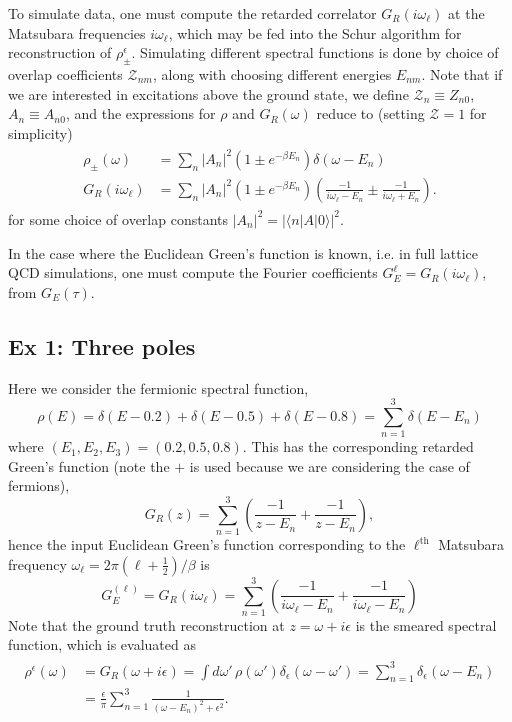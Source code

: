 To simulate data, one must compute the retarded correlator $G_R(i\omega_\ell)$ at the Matsubara frequencies $i\omega_\ell$, which may be fed into the Schur algorithm for reconstruction of $\rho_\pm^\epsilon$. Simulating different spectral functions is done by choice of overlap coefficients $\mathcal Z_{nm}$, along with choosing different energies $E_{nm}$. Note that if we are interested in excitations above the ground state, we define $\mathcal Z_{n} \equiv Z_{n0}$, $A_n\equiv A_{n0}$, and the expressions for $\rho$ and $G_R(\omega)$ reduce to (setting $\mathcal Z = 1$ for simplicity)
\begin{align}
\begin{split}
    \rho_\pm(\omega) &= \sum_n |A_n|^2 (1\pm e^{-\beta E_n}) \delta(\omega - E_n) \\
    G_R(i\omega_\ell) &= \sum_n |A_n|^2 (1\pm e^{-\beta E_n}) \left(\frac{-1}{i\omega_\ell - E_n} \pm \frac{-1}{i\omega_\ell + E_n} \right).
\end{split}
\end{align}
for some choice of overlap constants $|A_n|^2 = |\langle n | A | 0 \rangle|^2$. 

In the case where the Euclidean Green's function is known, i.e. in full lattice QCD simulations, one must compute the Fourier coefficients $G_E^{\ell} = G_R(i\omega_\ell)$, from $G_E(\tau)$. 

\subsection{Ex 1: Three poles}

Here we consider the fermionic spectral function,
\begin{equation}
    \rho(E) = \delta(E - 0.2) + \delta(E - 0.5) + \delta(E - 0.8) = \sum_{n = 1}^3 \delta(E - E_n)
\end{equation}
where $(E_1, E_2, E_3) = (0.2, 0.5, 0.8)$. This has the corresponding retarded Green's function (note the $+$ is used because we are considering the case of fermions),
\begin{equation}
    G_R(z) = \sum_{n = 1}^3 \left( \frac{-1}{z - E_n} + \frac{-1}{z - E_n} \right),
\end{equation}
hence the input Euclidean Green's function corresponding to the $\ell^\mathrm{th}$ Matsubara frequency $\omega_\ell = 2\pi (\ell + \frac{1}{2}) / \beta$ is
\begin{equation}
    G_E^{(\ell)} = G_R(i\omega_\ell) = \sum_{n = 1}^3 \left( \frac{-1}{i\omega_\ell - E_n} + \frac{-1}{i\omega_\ell - E_n} \right)
\end{equation}
Note that the ground truth reconstruction at $z = \omega + i\epsilon$ is the smeared spectral function, which is evaluated as
\begin{align}
\begin{split}
    \rho^\epsilon(\omega) &= G_R(\omega + i\epsilon) = \int d\omega'\, \rho(\omega')\delta_\epsilon(\omega - \omega') = \sum_{n = 1}^3 \delta_\epsilon(\omega - E_n) \\
    &=  \frac{\epsilon}{\pi} \sum_{n = 1}^3 \frac{1}{(\omega - E_n)^2 + \epsilon^2}.
\end{split}
\end{align}

